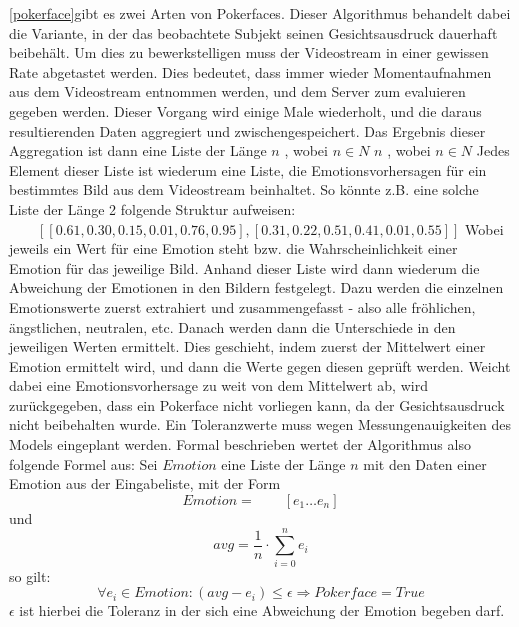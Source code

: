\documentclass[12pt, a4paper]{report}
\begin{document}
\ref{pokerface}gibt es zwei Arten von Pokerfaces. Dieser Algorithmus behandelt dabei die Variante, in der das beobachtete Subjekt seinen Gesichtsausdruck dauerhaft beibehält. Um dies zu bewerkstelligen muss der Videostream in einer gewissen Rate abgetastet werden. Dies bedeutet, dass immer wieder Momentaufnahmen aus dem Videostream entnommen werden, und dem Server zum evaluieren gegeben werden. Dieser Vorgang wird einige Male wiederholt, und die daraus resultierenden Daten aggregiert und zwischengespeichert. Das Ergebnis dieser Aggregation ist dann eine Liste der Länge
$ n $  , wobei $ n \in N $	$ n $  , wobei $ n \in N $
Jedes Element dieser Liste ist wiederum eine Liste, die Emotionsvorhersagen für ein bestimmtes Bild aus dem Videostream beinhaltet. So könnte z.B. eine solche Liste der Länge 2 folgende Struktur aufweisen: \newline
$ \qquad[ [0.61, 0.30, 0.15, 0.01, 0.76, 0.95] , [0.31, 0.22, 0.51, 0.41, 0.01, 0.55] ] $
Wobei jeweils ein Wert für eine Emotion steht bzw. die Wahrscheinlichkeit einer Emotion für das jeweilige Bild. Anhand dieser Liste wird dann wiederum die Abweichung der Emotionen in den Bildern festgelegt. Dazu werden die einzelnen Emotionswerte zuerst extrahiert und zusammengefasst - also alle fröhlichen, ängstlichen, neutralen, etc. Danach werden dann die Unterschiede in den jeweiligen Werten ermittelt.
Dies geschieht, indem zuerst der Mittelwert einer Emotion ermittelt wird, und dann die Werte gegen diesen geprüft werden. Weicht dabei eine Emotionsvorhersage zu weit von dem Mittelwert ab, wird zurückgegeben, dass ein Pokerface nicht vorliegen kann, da der Gesichtsausdruck nicht beibehalten wurde. Ein Toleranzwerte muss wegen Messungenauigkeiten des Models eingeplant werden.
Formal beschrieben wertet der Algorithmus also folgende Formel aus: \newline
Sei $ Emotion $ eine Liste der Länge $ n $ mit den Daten einer Emotion aus der Eingabeliste, mit der Form $$ Emotion = \qquad [e_{1} \dots e_{n}] $$ 	
und $$avg =\frac{1}{n} \cdot \sum_{i = 0}^{n} e_{i} $$ so gilt:
\newline 
$$ \forall e_{i} \in Emotion : (avg - e_{i} ) \leq \epsilon \Rightarrow Pokerface = True $$	\newline
 $ \epsilon$ ist hierbei die Toleranz in der sich eine Abweichung der Emotion begeben darf.
\end{document}
